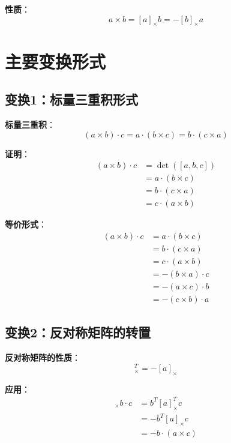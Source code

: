 \documentclass[12pt,a4paper]{article}
\begin{document}
\textbf{性质}：
\begin{equation}
a \times b = [a]_{\times} b = -[b]_{\times} a
\end{equation}

\section{主要变换形式}

\subsection{变换1：标量三重积形式}

\textbf{标量三重积}：
\begin{equation}
(a \times b) \cdot c = a \cdot (b \times c) = b \cdot (c \times a)
\end{equation}

\textbf{证明}：
\begin{align}
(a \times b) \cdot c &= \det([a, b, c]) \\
&= a \cdot (b \times c) \\
&= b \cdot (c \times a) \\
&= c \cdot (a \times b)
\end{align}

\textbf{等价形式}：
\begin{align}
(a \times b) \cdot c &= a \cdot (b \times c) \\
&= b \cdot (c \times a) \\
&= c \cdot (a \times b) \\
&= -(b \times a) \cdot c \\
&= -(a \times c) \cdot b \\
&= -(c \times b) \cdot a
\end{align}

\subsection{变换2：反对称矩阵的转置}

\textbf{反对称矩阵的性质}：
\begin{equation}
[a]_{\times}^T = -[a]_{\times}
\end{equation}

\textbf{应用}：
\begin{align}
[a]_{\times} b \cdot c &= b^T [a]_{\times}^T c \\
&= -b^T [a]_{\times} c \\
&= -b \cdot (a \times c)
\end{align}
\end{document}
